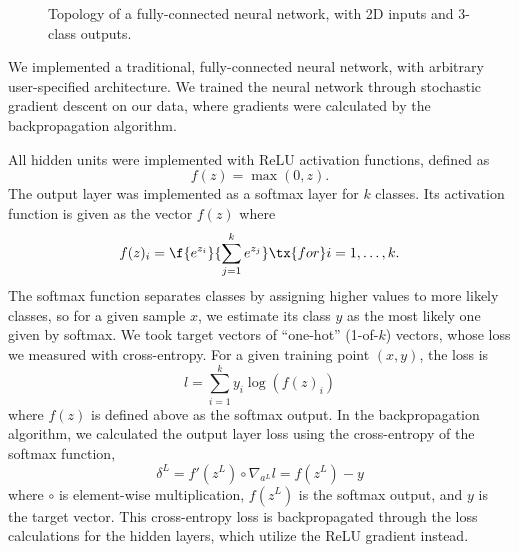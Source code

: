 \documentclass{article}
\begin{document}
\begin{multicols}{2}
\begin{figure}[t]
    \caption{Topology of a fully-connected neural network, with 2D inputs and 3-class outputs.}
\end{figure}

We implemented a traditional, fully-connected neural network,
with arbitrary user-specified architecture.
We trained the neural network
through stochastic gradient descent on our data,
where gradients were calculated by the
backpropagation algorithm.

All hidden units were implemented with ReLU activation functions,
defined as
\begin{equation}
    f(z) = \max(0, z).
\end{equation}
The output layer was implemented as a softmax layer for $k$ classes.
Its activation function is given as the vector $f(z)$ where
\begin{equation}
    f(z)_i = \f{e^{z_i}}{\sum_{j=1}^{k}{e^{z_j}}} \tx{ for } i = 1,\dots,k.
\end{equation}
The softmax function separates classes
by assigning higher values to more likely classes,
so for a given sample $x$, we estimate its class $y$ as the most likely one
given by softmax.
We took target vectors of ``one-hot'' (1-of-$k$) vectors,
whose loss we measured with cross-entropy.
For a given training point $(x,y)$, the loss is
\begin{equation}
    l = \sum_{i = 1}^k{y_i \log(f(z)_i)}
\end{equation}
where $f(z)$ is defined above as the softmax output.
In the backpropagation algorithm,
we calculated the output layer loss using
the cross-entropy of the softmax function,
\begin{equation}
    \delta^L = f'(z^L)\circ\nabla_{a^L}l = f(z^L) - y
\end{equation}
where $\circ$ is element-wise multiplication, $f(z^L)$ is the softmax output,
and $y$ is the target vector.
This cross-entropy loss is backpropagated through the
loss calculations for the hidden layers,
which utilize the ReLU gradient instead.


\end{multicols}
\end{document}
